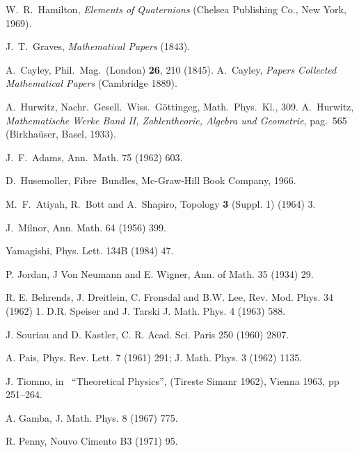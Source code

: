 \documentclass[a4paper,12pt]{book}
\begin{document}
\newpage


\begin{thebibliography}{999}
  W.~R.~Hamilton, \textit{Elements of Quaternions} (Chelsea
Publishing Co., New York, 1969).

  J.~T.~Graves, \textit{Mathematical Papers} (1843).

  A.~Cayley, Phil.~Mag.~(London) \textbf{26}, 210 (1845).
A.~Cayley, \textit{Papers Collected Mathematical Papers} (Cambridge 1889).

  A.~Hurwitz, Nachr.~Gesell.~Wiss.~G\"{o}ttingeg,
Math.~Phys.~Kl., 309.\newline
A.~Hurwitz, \textit{Mathematische Werke Band II, Zahlentheorie, Algebra und
Geometrie}, pag.~565 (Birkha\"{u}ser, Basel, 1933).

  J.~F.~Adams, Ann.~Math. 75 (1962) 603.

  D.~Husemoller, Fibre~Bundles, Mc-Graw-Hill Book Company,
1966.

  M.~F.~Atiyah, R.~Bott and A.~Shapiro, Topology \textbf{3}
(Suppl. 1) (1964) 3.

  J.~Milnor, Ann. Math. 64 (1956) 399.

  Yamagishi, Phys. Lett. 134B (1984) 47.

  P. Jordan, J Von Neumann and E. Wigner, Ann. of Math. 35
(1934) 29.

  R. E. Behrends, J. Dreitlein, C. Fronsdal and B.W. Lee, Rev.
Mod. Phys. 34 (1962) 1.\newline
D.R. Speiser and J. Tarski J. Math. Phys. 4 (1963) 588.

  J. Souriau and D. Kastler, C. R. Acad. Sci. Paris 250 (1960)
2807.

  A. Pais, Phys. Rev. Lett. 7 (1961) 291; J. Math. Phys. 3
(1962) 1135.

  J. Tiomno, in \ ``Theoretical Physics'', (Tireste Simanr
1962), Vienna 1963, pp 251--264.

  A. Gamba, J. Math. Phys. 8 (1967) 775.

  R. Penny, Nouvo Cimento B3 (1971) 95.


\end{thebibliography}
\end{document}
